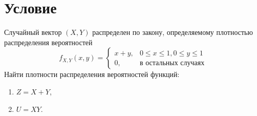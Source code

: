 \documentclass[a4paper,12pt]{article}
\begin{document}
    \section*{Условие}
    Случайный вектор $\left ( X, Y \right )$ распределен по закону, определяемому плотностью распределения вероятностей
    $$
    f_{X, Y} ( x, y )
    = \left \{
    \begin{array}{ll}
        x + y, & 0 \le x \le 1, 0 \le y \le 1 \\
        0,     & \text{в остальных случаях}
    \end{array}
    \right .
    $$
    Найти плотности распределения вероятностей функций:
    \begin{enumerate}
        \item $Z = X + Y$,
        \item $U = XY$.
    \end{enumerate}
\end{document}
